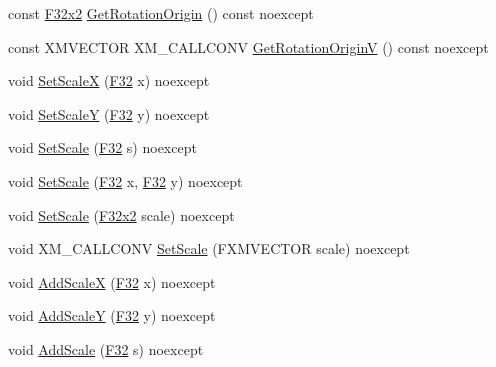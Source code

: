 \begin{DoxyCompactItemize}
\item 
const \mbox{\hyperlink{namespacemage_aee4759dedc8def6c6dec26b5c7eddf29}{F32x2}} \mbox{\hyperlink{classmage_1_1_texture_transform_a22ace56e39d1987fb0d46982536121fe}{Get\+Rotation\+Origin}} () const noexcept
\item 
const X\+M\+V\+E\+C\+T\+OR X\+M\+\_\+\+C\+A\+L\+L\+C\+O\+NV \mbox{\hyperlink{classmage_1_1_texture_transform_a62a64589318d6cdc6792f732a34468a1}{Get\+Rotation\+OriginV}} () const noexcept
\item 
void \mbox{\hyperlink{classmage_1_1_texture_transform_ae038a7bf4d879c67e898db1fc8093900}{Set\+ScaleX}} (\mbox{\hyperlink{namespacemage_aa97e833b45f06d60a0a9c4fc22ae02c0}{F32}} x) noexcept
\item 
void \mbox{\hyperlink{classmage_1_1_texture_transform_a4bde9ccfddadb77589d0703bd7e394b6}{Set\+ScaleY}} (\mbox{\hyperlink{namespacemage_aa97e833b45f06d60a0a9c4fc22ae02c0}{F32}} y) noexcept
\item 
void \mbox{\hyperlink{classmage_1_1_texture_transform_aee6f84fbb4b7d57931aab72b6cec5b6c}{Set\+Scale}} (\mbox{\hyperlink{namespacemage_aa97e833b45f06d60a0a9c4fc22ae02c0}{F32}} s) noexcept
\item 
void \mbox{\hyperlink{classmage_1_1_texture_transform_ac3af8885cf4b4c6ad97138bbaf12cda1}{Set\+Scale}} (\mbox{\hyperlink{namespacemage_aa97e833b45f06d60a0a9c4fc22ae02c0}{F32}} x, \mbox{\hyperlink{namespacemage_aa97e833b45f06d60a0a9c4fc22ae02c0}{F32}} y) noexcept
\item 
void \mbox{\hyperlink{classmage_1_1_texture_transform_af9c43dc005cf657817b9a513e19dea3c}{Set\+Scale}} (\mbox{\hyperlink{namespacemage_aee4759dedc8def6c6dec26b5c7eddf29}{F32x2}} scale) noexcept
\item 
void X\+M\+\_\+\+C\+A\+L\+L\+C\+O\+NV \mbox{\hyperlink{classmage_1_1_texture_transform_a22ba108c7623abc2abdd8f9fde4d53bd}{Set\+Scale}} (F\+X\+M\+V\+E\+C\+T\+OR scale) noexcept
\item 
void \mbox{\hyperlink{classmage_1_1_texture_transform_a6b15e635a3210008086786c274233acb}{Add\+ScaleX}} (\mbox{\hyperlink{namespacemage_aa97e833b45f06d60a0a9c4fc22ae02c0}{F32}} x) noexcept
\item 
void \mbox{\hyperlink{classmage_1_1_texture_transform_a48d0a0ebd014f3fd3d8f30c750763273}{Add\+ScaleY}} (\mbox{\hyperlink{namespacemage_aa97e833b45f06d60a0a9c4fc22ae02c0}{F32}} y) noexcept
\item 
void \mbox{\hyperlink{classmage_1_1_texture_transform_a494965e060dd40a1c86f5493d734c1a7}{Add\+Scale}} (\mbox{\hyperlink{namespacemage_aa97e833b45f06d60a0a9c4fc22ae02c0}{F32}} s) noexcept

\end{DoxyCompactItemize}
